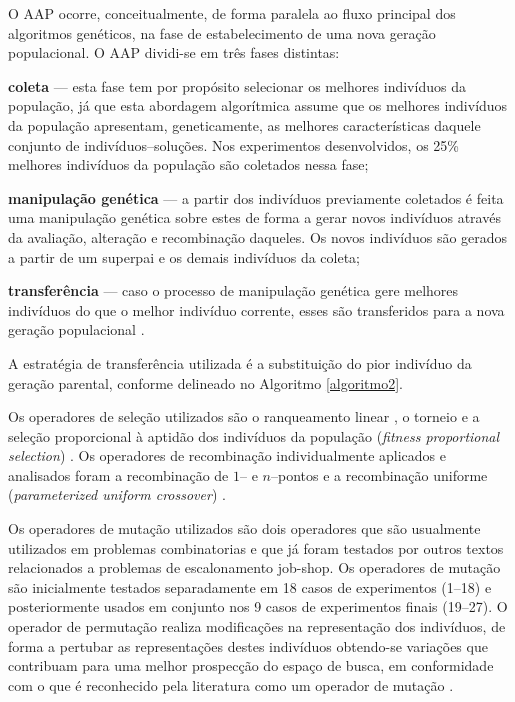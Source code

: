\documentclass[relatorio,nocolorlinks]{inf-ufg}
\begin{document}
O AAP ocorre, conceitualmente, de forma paralela ao fluxo principal dos algoritmos gen\'{e}ticos, na fase de estabelecimento de uma nova
gera\c{c}\~{a}o populacional. O AAP dividi-se em tr\^{e}s fases distintas:
\begin{inparaenum}[\itshape 1\upshape)]
\item \textbf{coleta} --- esta fase tem por prop\'{o}sito selecionar os melhores indiv\'{i}duos da popula\c{c}\~{a}o, j\'{a} que esta abordagem
algor\'{i}tmica assume que os melhores indiv\'{i}duos da popula\c{c}\~{a}o apresentam, geneticamente, as melhores caracter\'{i}sticas daquele
conjunto de indiv\'{i}duos--solu\c{c}\~{o}es. Nos experimentos desenvolvidos, os 25\% melhores indiv\'{i}duos da popula\c{c}\~{a}o s\~{a}o
coletados nessa fase;
\item \textbf{manipula\c{c}\~{a}o gen\'{e}tica} --- a partir dos indiv\'{i}duos previamente coletados \'{e} feita uma manipula\c{c}\~{a}o
gen\'{e}tica sobre estes de forma a gerar novos indiv\'{i}duos atrav\'{e}s da avalia\c{c}\~{a}o, altera\c{c}\~{a}o e recombina\c{c}\~{a}o
daqueles. Os novos indiv\'{i}duos s\~{a}o gerados a partir de um superpai e os demais indiv\'{i}duos da coleta;
\item \textbf{transfer\^{e}ncia} --- caso o processo de manipula\c{c}\~{a}o gen\'{e}tica gere melhores indiv\'{i}duos do que o melhor indiv\'{i}duo
corrente, esses s\~{a}o transferidos para a nova gera\c{c}\~{a}o populacional \cite{Camilo2011}.
\end{inparaenum}
A estrat\'{e}gia de transfer\^{e}ncia utilizada \'{e} a substitui\c{c}\~{a}o do pior indiv\'{i}duo da gera\c{c}\~{a}o parental, conforme delineado
no Algoritmo \ref{algoritmo2}.

Os operadores de sele\c{c}\~{a}o utilizados s\~{a}o o ranqueamento linear \cite{DeJong2006}, o torneio \cite{Engelbrecht2007} \cite{Miller1995}
e a sele\c{c}\~{a}o proporcional \`{a} aptid\~{a}o dos indiv\'{i}duos da popula\c{c}\~{a}o (\textit{fitness proportional selection})
\cite{DeJong2006}. Os operadores de recombina\c{c}\~{a}o individualmente aplicados e analisados foram a recombina\c{c}\~{a}o de $1$-- e
$n$--pontos \cite{DeJong2006} e a recombina\c{c}\~{a}o uniforme (\textit{parameterized uniform crossover}) \cite{DeJong2006} \cite{Goncalves2002}.

Os operadores de muta\c{c}\~{a}o utilizados s\~{a}o dois operadores que s\~{a}o usualmente utilizados em problemas combinatorias e que j\'{a}
foram testados por outros textos relacionados a problemas de escalonamento job-shop. Os operadores de muta\c{c}\~{a}o s\~{a}o inicialmente
testados separadamente em 18 casos de experimentos (1--18) e posteriormente usados em conjunto nos 9 casos de experimentos finais (19--27).
O operador de permuta\c{c}\~{a}o \cite{DeJong2006} \cite{Lin2010} realiza modifica\c{c}\~{o}es na representa\c{c}\~{a}o dos indiv\'{i}duos,
de forma a pertubar as representa\c{c}\~{o}es destes indiv\'{i}duos obtendo-se varia\c{c}\~{o}es que contribuam para uma melhor prospec\c{c}\~{a}o do
espa\c{c}o de busca, em conformidade com o que \'{e} reconhecido pela literatura como um operador de muta\c{c}\~{a}o \cite{DeJong2006}.
\end{document}

